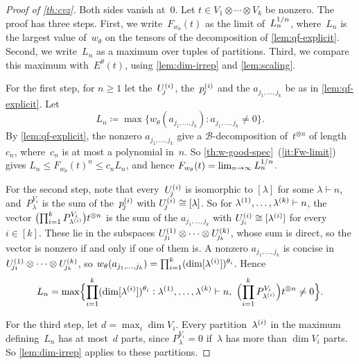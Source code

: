 \documentclass[11pt,letterpaper]{article}
\begin{document}
\begin{proof}[Proof of \cref{th:cvz}]
Both sides vanish at~$0$. Let $t \in V_1 \otimes \cdots \otimes V_k$ be nonzero. The proof has three steps. First, we write~$F_{w_\theta}(t)$ as the limit of~$L_n^{\smash[t]{1/n}}$, where~$L_n$ is the largest value of~$w_\theta$ on the tensors of the decomposition of \cref{lem:qf-explicit}. Second, we write~$L_n$ as a maximum over tuples of partitions. Third, we compare this maximum with~$E^\theta(t)$, using \cref{lem:dim-irrep} and \cref{lem:scaling}.

For the first step, for $n \geq 1$ let the~$U^{\smash{(i)}}_{\!j}$, the~$p^{\smash{(i)}}_{\!j}$ and the $a_{j_1, \ldots, j_k}$ be as in \cref{lem:qf-explicit}. Let
\[
L_n \coloneqq \max\bigl\{ w_\theta(a_{j_1, \ldots, j_k}) : a_{j_1, \ldots, j_k} \neq 0 \bigr\}.
\]
By \cref{lem:qf-explicit}, the nonzero $a_{j_1, \ldots, j_k}$ give a $\mathcal{B}$-decomposition of~$t^{\otimes n}$ of length~$c_n$, where~$c_n$ is at most a polynomial in~$n$. So \cref{th:w-good-spec}~(\ref{it:Fw-limit}) gives $L_n \leq F_{w_\theta}(t)^n \leq c_n L_n$, and hence $F_{w_\theta}(t) = \lim_{n \to \infty} L_n^{\smash[t]{1/n}}$.

For the second step, note that every~$U^{\smash{(i)}}_{\!\smash[b]{j}}$ is isomorphic to $[\lambda]$ for some $\lambda \vdash n$, and~$P^{V_i}_\lambda$ is the sum of the~$p^{\smash{(i)}}_{\!j}$ with $U^{\smash{(i)}}_{\!j} \cong [\lambda]$. So for $\lambda^{\smash{(1)}}, \ldots, \lambda^{\smash{(k)}} \vdash n$, the vector $\bigl(\prod_{i=1}^{\smash[t]{k}} P^{\smash[t]{V_i}}_{\lambda^{\smash{(i)}}}\bigr) t^{\otimes n}$ is the sum of the $a_{j_1, \ldots, j_k}$ with $U^{\smash{(i)}}_{\!j_i} \cong [\lambda^{\smash{(i)}}]$ for every $i \in [k]$. These lie in the subspaces $U^{\smash{(1)}}_{\!j_1} \otimes \cdots \otimes U^{\smash{(k)}}_{\!j_k}$, whose sum is direct, so the vector is nonzero if and only if one of them is. A nonzero $a_{j_1, \ldots, j_k}$ is concise in $U^{\smash{(1)}}_{\!j_1} \otimes \cdots \otimes U^{\smash{(k)}}_{\!j_k}$, so $w_\theta(a_{j_1, \ldots, j_k}) = \prod_{i=1}^{\smash[t]{k}} (\dim [\lambda^{\smash{(i)}}])^{\smash{\theta_i}}$. Hence
\[
L_n = \max \Bigl\{ \prod_{i=1}^k (\dim [\lambda^{(i)}])^{\theta_i} : \lambda^{(1)}, \ldots, \lambda^{(k)} \vdash n,\ \Bigl(\prod_{i=1}^k P^{V_i}_{\lambda^{(i)}}\Bigr) t^{\otimes n} \neq 0 \Bigr\}.
\]

For the third step, let $d = \max_i \dim V_i$. Every partition~$\lambda^{\smash{(i)}}$ in the maximum defining~$L_n$ has at most~$d$ parts, since $P^{V_i}_\lambda = 0$ if~$\lambda$ has more than $\dim V_i$ parts. So \cref{lem:dim-irrep} applies to these partitions.


\end{proof}
\end{document}
